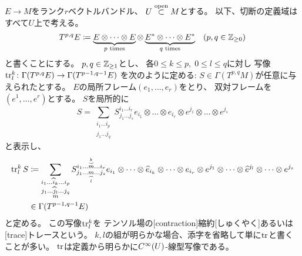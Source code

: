 \documentclass[report]{jlreq}
\begin{document}
\begin{definition}[テンソル場の縮約]
    $E \to M$をランク$r$ベクトルバンドル、
    $U \stackrel{\text{open}}{\subset} M$とする。
    以下、切断の定義域はすべて$U$上で考える。
    \begin{equation}
        T^{p, q} E \coloneqq
            \underbrace{E \otimes \dots \otimes E}_{p \text{ times}}
            \otimes
            \underbrace{E^* \otimes \dots \otimes E^*}_{q \text{ times}}
            \quad
            (p, q \in \mathbb{Z}_{\ge 0})
    \end{equation}
    と書くことにする。
    $p, q \in \mathbb{Z}_{\ge 1}$とし、
    各$0 \le k \le p, \; 0 \le l \le q$に対し
    写像$\operatorname{tr}^k_l \colon \Gamma(T^{p, q} E) \to \Gamma(T^{p - 1, q - 1} E)$
    を次のように定める:
    $S \in \Gamma(T^{p, q}M)$が任意に与えられたとする。
    $E$の局所フレーム$(e_1, \dots, e_r)$をとり、
    双対フレームを$(e^1, \dots, e^r)$とする。
    $S$を局所的に
    \begin{equation}
        S = \sum_{\substack{i_1 \dots i_p \\ j_1 \dots j_q}}
            S^{i_1 \dots i_r}_{j_1 \dots j_s}
            e_{i_1} \otimes \dots \otimes e_{i_r}
            \otimes
            e^{j_1} \otimes \dots \otimes e^{j_s}
    \end{equation}
    と表示し、
    \begin{alignat}{1}
        \operatorname{tr}^k_l S &\coloneqq
            \sum_{
                \substack{
                    i_1 \dots \widehat{i}_k \dots i_p \\
                    j_1 \dots \widehat{j}_l \dots j_q \\
                    m
                }
            }
            S^{
                i_1 \dots \overset{\stackrel{k}{\smile}}{m} \dots i_r
            }_{
                j_1 \dots \underset{\stackrel{\frown}{l}}{m} \dots j_s
            }
            e_{i_1} \otimes \dots \otimes \widehat{e}_{i_k} \otimes \dots \otimes e_{i_r}
            \otimes
            e^{j_1} \otimes \dots \otimes \widehat{e}^{j_l} \otimes \dots \otimes e^{j_s} \\
            &\in \Gamma(T^{p - 1, q - 1} E)
    \end{alignat}
    と定める。
    この写像$\operatorname{tr}^k_l$を
    テンソル場の[contraction]{縮約}[しゅくやく]あるいは
    [trace]{トレース}という。
    $k, l$の組が明らかな場合、添字を省略して単に$\operatorname{tr}$と書くことが多い。
    $\operatorname{tr}$は定義から明らかに$C^\infty(U)$-線型写像である。
\end{definition}
\end{document}
